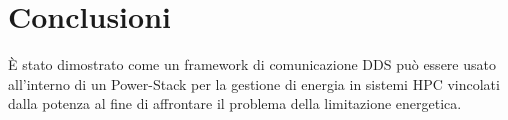 \chapter{Conclusioni}

È stato dimostrato come un framework di comunicazione DDS può essere usato all'interno di un Power-Stack per la gestione di energia in sistemi HPC vincolati dalla potenza al fine di affrontare il problema della limitazione energetica. %